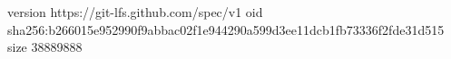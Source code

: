 version https://git-lfs.github.com/spec/v1
oid sha256:b266015e952990f9abbac02f1e944290a599d3ee11dcb1fb73336f2fde31d515
size 38889888
